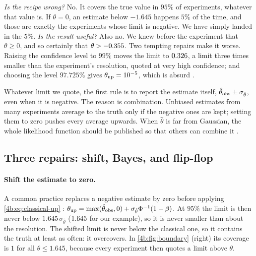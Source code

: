 \emph{Is the recipe wrong?} No. It covers the true value in $95\%$ of
experiments, whatever that value is. If $\theta=0$, an estimate below $-1.645$
happens $5\%$ of the time, and those are exactly the experiments whose limit
is negative. We have simply landed in the $5\%$. \emph{Is the result useful?}
Also no. We knew before the experiment that $\theta\ge0$, and so certainly
that $\theta>-0.355$. Two tempting repairs make it worse. Raising the
confidence level to $99\%$ moves the limit to $0.326$, a limit
three times smaller than the experiment's resolution, quoted at very high
confidence; and choosing the level $97.725\%$ gives $\theta_{\rm up}=10^{-5}$,
which is absurd .

Whatever limit we quote, the first rule is to report the estimate itself,
$\hat\theta_{\rm obs}\pm\sigma_{\hat\theta}$, even when it is negative. The
reason is combination. Unbiased estimates from many experiments average to the
truth only if the negative ones are kept; setting them to zero pushes every
average upwards. When
$\hat\theta$ is far from Gaussian, the whole likelihood function should be
published so that others can combine it .

\subsection{Three repairs: shift, Bayes, and flip-flop}
\label{4b:sec:repairs}

\paragraph{Shift the estimate to zero.}
A common practice replaces a negative estimate by zero before applying
\eqref{4b:eq:classical-up} :
$\theta_{\rm up}=\max(\hat\theta_{\rm obs},0)+\sigma_{\hat\theta}\Phi^{-1}(1-\beta)$.
At $95\%$ the limit is then never below $1.645\,\sigma_{\hat\theta}$
($1.645$ for our example), so it is never smaller than about the
resolution. The shifted limit is never below the classical one, so it contains
the truth at least as often: it overcovers. In \cref{4b:fig:boundary} (right) its coverage is $1$ for all
$\theta\le1.645$, because every experiment then quotes a limit above $\theta$.

